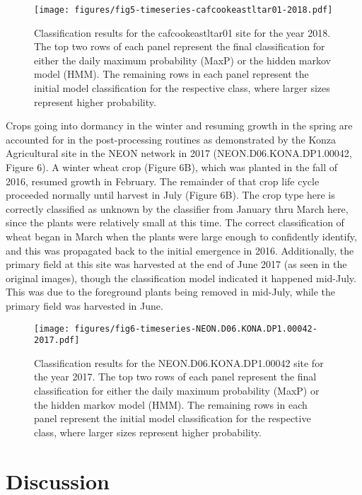 \documentclass{article}
\begin{document}
\begin{figure}[!ht]
    \centering
    \texttt{[image: figures/fig5-timeseries-cafcookeastltar01-2018.pdf]}
    \caption{Classification results for the cafcookeastltar01 site for the year 2018. The top two rows of each panel represent the final classification for either the daily maximum probability (MaxP) or the hidden markov model (HMM). The remaining rows in each panel represent the initial model classification for the respective class, where larger sizes represent higher probability. }
    \label{fig5}
\end{figure}

Crops going into dormancy in the winter and resuming growth in the spring are accounted for in the post-processing routines as demonstrated by the Konza Agricultural site in the NEON network in 2017 (NEON.D06.KONA.DP1.00042, Figure 6). A winter wheat crop (Figure 6B), which was planted in the fall of 2016, resumed growth in February. The remainder of that crop life cycle proceeded normally until harvest in July (Figure 6B). The crop type here is correctly classified as unknown by the classifier from January thru March here, since the plants were relatively small at this time. The correct classification of wheat began in March when the plants were large enough to confidently identify, and this was propagated back to the initial emergence in 2016. Additionally, the primary field at this site was harvested at the end of June 2017 (as seen in the original images), though the classification model indicated it happened mid-July. This was due to the foreground plants being removed in mid-July, while the primary field was harvested in June. 

\begin{figure}[!ht]
    \centering
    \texttt{[image: figures/fig6-timeseries-NEON.D06.KONA.DP1.00042-2017.pdf]}
    \caption{Classification results for the NEON.D06.KONA.DP1.00042 site for the year 2017. The top two rows of each panel represent the final classification for either the daily maximum probability (MaxP) or the hidden markov model (HMM). The remaining rows in each panel represent the initial model classification for the respective class, where larger sizes represent higher probability.}
    \label{fig6}
\end{figure}

\section{Discussion}
\end{document}
